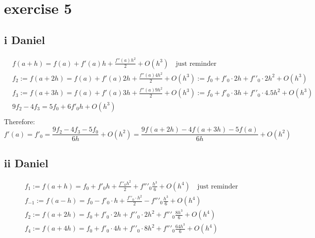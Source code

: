 \documentclass{article}
\begin{document}
\section{exercise 5}
\subsection{i Daniel}
\begin{align}
     & f\left( a+h \right) = f\left( a \right)+f'\left( a \right)h+\frac{f''\left( a \right){{h}^{2}}}{2}+O\left( {{h}^{3}} \right)\quad \text{just reminder}                                                                           \\
     & {{f}_{2}}:=f\left( a+2h \right) = f\left( a \right)+f'\left( a \right)2h+\frac{f''\left( a \right)4{{h}^{2}}}{2}+O\left( {{h}^{3}} \right):={{f}_{0}}+f{{'}_{0}}\cdot 2h+f'{{'}_{0}}\cdot 2{{h}^{2}}+O\left( {{h}^{3}} \right)   \\
     & {{f}_{3}}:=f\left( a+3h \right) = f\left( a \right)+f'\left( a \right)3h+\frac{f''\left( a \right)9{{h}^{2}}}{2}+O\left( {{h}^{3}} \right):={{f}_{0}}+f{{'}_{0}}\cdot 3h+f'{{'}_{0}}\cdot 4.5{{h}^{2}}+O\left( {{h}^{3}} \right) \\
     & 9{{f}_{2}}-4{{f}_{3}}=5{{f}_{0}}+6f{{'}_{0}}h+O\left( {{h}^{3}} \right)                                                                                                                                                          \\
\end{align}
Therefore:
\[f'\left( a \right)=f{{'}_{0}}=\frac{9{{f}_{2}}-4{{f}_{3}}-5{{f}_{0}}}{6h}+O\left( {{h}^{2}} \right)=\frac{9f\left( a+2h \right)-4f\left( a+3h \right)-5f\left( a \right)}{6h}+O\left( {{h}^{2}} \right)\]
\subsection{ii Daniel}

\begin{align}
     & {{f}_{1}}:=f\left( a+h \right)={{f}_{0}}+f{{'}_{0}}h+\frac{f'{{'}_{0}}{{h}^{2}}}{2}+f''{{'}_{0}}\frac{{{h}^{3}}}{6}+O\left( {{h}^{4}} \right)\quad \text{just reminder} \\
     & {{f}_{-1}}:=f\left( a-h \right)={{f}_{0}}-f{{'}_{0}}\cdot h+\frac{f'{{'}_{0}}\cdot {{h}^{2}}}{2}-f''{{'}_{0}}\frac{{{h}^{3}}}{6}+O\left( {{h}^{4}} \right)              \\
     & {{f}_{2}}:=f\left( a+2h \right)={{f}_{0}}+f{{'}_{0}}\cdot 2h+f'{{'}_{0}}\cdot 2{{h}^{2}}+f''{{'}_{0}}\frac{8{{h}^{3}}}{6}+O\left( {{h}^{4}} \right)                     \\
     & {{f}_{4}}:=f\left( a+4h \right)={{f}_{0}}+f{{'}_{0}}\cdot 4h+f'{{'}_{0}}\cdot 8{{h}^{2}}+f''{{'}_{0}}\frac{64{{h}^{3}}}{6}+O\left( {{h}^{4}} \right)                    \\
\end{align}
\end{document}
